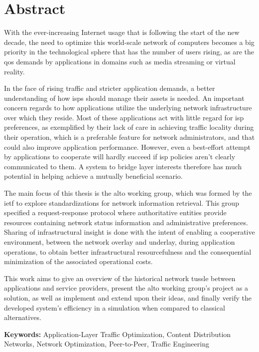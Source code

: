 \chapter{Abstract}

    With the ever-increasing Internet usage that is following the start of the new decade, the need to optimize this world-scale network of computers becomes a big priority in the technological sphere that has the number of users rising, as are the \gls{qos} demands by applications in domains such as media streaming or virtual reality.

    In the face of rising traffic and stricter application demands, a better understanding of how \glspl{isp} should manage their assets is needed.
    An important concern regards to how applications utilize the underlying network infrastructure over which they reside.
    Most of these applications act with little regard for \gls{isp} preferences, as exemplified by their lack of care in achieving traffic locality during their operation, which is a preferable feature for network administrators, and that could also improve application performance.
    However, even a best-effort attempt by applications to cooperate will hardly succeed if \gls{isp} policies aren't clearly communicated to them.
    A system to bridge layer interests therefore has much potential in helping achieve a mutually beneficial scenario.

    The main focus of this thesis is the \gls{alto} working group, which was formed by the \gls{ietf} to explore standardizations for network information retrieval. 
    This group specified a request-response protocol where authoritative entities provide resources containing network status information and administrative preferences.
    Sharing of infrastructural insight is done with the intent of enabling a cooperative environment, between the network overlay and underlay, during application operations, to obtain better infrastructural resourcefulness and the consequential minimization of the associated operational costs.

    This work aims to give an overview of the historical network tussle between applications and service providers, present the \gls{alto} working group's project as a solution, as well as implement and extend upon their ideas, and finally verify the developed system's efficiency in a simulation when compared to classical alternatives.

    \bigskip

    \textbf{Keywords:} Application-Layer Traffic Optimization, Content Distribution Networks, Network Optimization, Peer-to-Peer, Traffic Engineering

